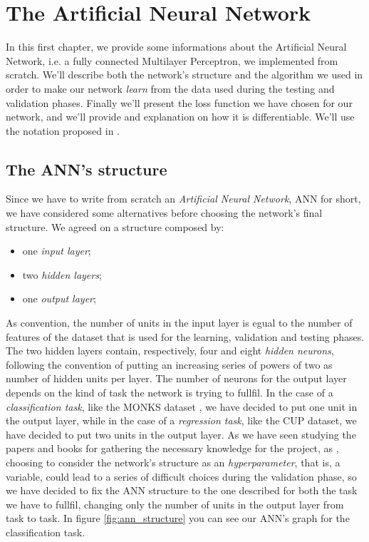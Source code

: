\chapter{The Artificial Neural Network} %
\label{cha:the_artificial_neural_network}
	In this first chapter, we provide some informations about the Artificial Neural Network, i.e. a fully
	connected Multilayer Perceptron, we implemented from scratch. We'll describe both the network's structure and
	the algorithm we used in order to make our network \textit{learn} from the data used during the testing and
	validation phases. Finally we'll present the loss function we have chosen for our network, and we'll provide
	and explanation on how it is differentiable. We'll use the notation proposed in \cite{Goodfellow-et-al-2016}.

	\section{The ANN's structure} %
	\label{sec:the_ann_s_structure}
		Since we have to write from scratch an \textit{Artificial Neural Network}, ANN for short, we have
		considered some alternatives before choosing the network's final structure. We agreed on a structure
		composed by:

		\begin{itemize}
			\item one \textit{input layer};
			\item two \textit{hidden layers};
			\item one \textit{output layer};
		\end{itemize}

		As convention, the number of units in the input layer is egual to the number
		of features of the dataset that is used for the learning, validation and testing phases. The two
		hidden layers contain, respectively, four and eight \textit{hidden neurons}, following the convention of
		putting an increasing series of powers of two as number of hidden units per layer. The number of neurons
		for the output layer depends on the kind of task the network is trying to fullfil. In the case of a
		\textit{classification task}, like the MONKS dataset \cite{Dua:2019}, we have decided to put one unit in
		the output layer, while in the case of a \textit{regression task}, like the CUP dataset, we have decided to
		put two units in the output layer. As we have seen studying the papers and books for gathering the
		necessary knowledge for the project, as \cite{Goodfellow-et-al-2016,haykin2009neural,mitchell1997machine},
		choosing to consider the network's structure as an \textit{hyperparameter}, that is, a variable, could
		lead to a series of difficult choices during the validation phase, so we have decided to fix the ANN
		structure to the one described for both the task we have to fullfil, changing only the number of units in
		the output layer from task to task. In figure \ref{fig:ann_structure} you can see our ANN's graph for
		the classification task.

